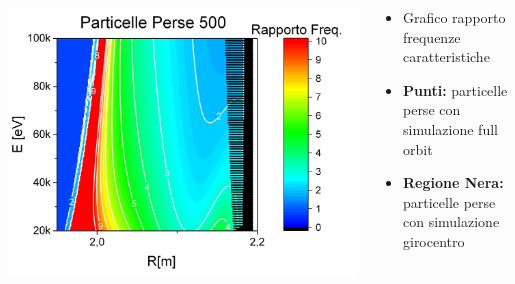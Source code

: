 \begin{frame}
\begin{columns}
\begin{column}{0.4\textwidth}
\begin{center}
		\includegraphics[scale=0.20]{Immagini/Simulazioni/Risonanze/lost_particles_500_160.png}\hspace{-10pt}
		\end{center}
	\end{column}
	\begin{column}{0.4\textwidth}
		\begin{itemize}
			\item Grafico rapporto frequenze caratteristiche
			\item {\bf Punti:} particelle perse con simulazione full orbit
			\item {\bf Regione Nera:} particelle perse con simulazione girocentro
		\end{itemize}
	\end{column}
\end{columns}
\end{frame}

